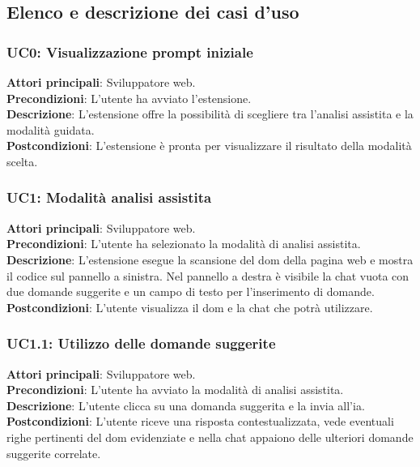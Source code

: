 \subsection{Elenco e descrizione dei casi d'uso}
\subsubsection*{UC0: Visualizzazione prompt iniziale}
\noindent \textbf{Attori principali}: Sviluppatore web.\\
\textbf{Precondizioni}: L'utente ha avviato l’estensione.\\
\textbf{Descrizione}: L’estensione offre la possibilità di scegliere tra l’analisi assistita e la modalità guidata.\\
\textbf{Postcondizioni}: L’estensione è pronta per visualizzare il risultato della modalità scelta.\\

\subsubsection*{UC1: Modalità analisi assistita}
\noindent \textbf{Attori principali}: Sviluppatore web.\\
\textbf{Precondizioni}: L’utente ha selezionato la modalità di analisi assistita.\\
\textbf{Descrizione}: L’estensione esegue la scansione del \acrshort{dom} della pagina web e mostra il codice sul pannello a sinistra. Nel pannello a destra è visibile la chat vuota con due domande suggerite e un campo di testo per l'inserimento di domande.\\
\textbf{Postcondizioni}: L’utente visualizza il \acrshort{dom} e la chat che potrà utilizzare.\\

\subsubsection*{UC1.1: Utilizzo delle domande suggerite}
\noindent \textbf{Attori principali}: Sviluppatore web.\\
\textbf{Precondizioni}: L’utente ha avviato la modalità di analisi assistita.\\
\textbf{Descrizione}: L’utente clicca su una domanda suggerita e la invia all'\acrshort{ia}.\\
\textbf{Postcondizioni}: L’utente riceve una risposta contestualizzata, vede eventuali righe pertinenti del \acrshort{dom} evidenziate e nella chat appaiono delle ulteriori domande suggerite correlate.\\

